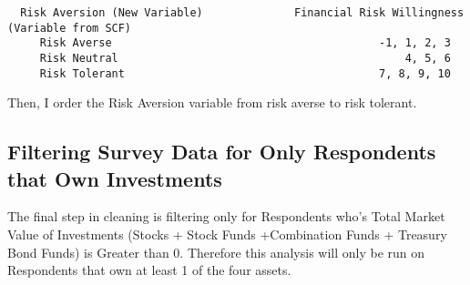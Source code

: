 \documentclass[
]{article}
\newenvironment{Shaded}{\begin{snugshade}}{\end{snugshade}}
\newcommand{\DataTypeTok}[1]{\textcolor[rgb]{0.13,0.29,0.53}{#1}}
\newcommand{\DecValTok}[1]{\textcolor[rgb]{0.00,0.00,0.81}{#1}}
\newcommand{\KeywordTok}[1]{\textcolor[rgb]{0.13,0.29,0.53}{\textbf{#1}}}
\newcommand{\NormalTok}[1]{#1}
\newcommand{\OperatorTok}[1]{\textcolor[rgb]{0.81,0.36,0.00}{\textbf{#1}}}
\newcommand{\OtherTok}[1]{\textcolor[rgb]{0.56,0.35,0.01}{#1}}
\newcommand{\StringTok}[1]{\textcolor[rgb]{0.31,0.60,0.02}{#1}}
\begin{document}
\begin{verbatim}
  Risk Aversion (New Variable)              Financial Risk Willingness (Variable from SCF)
     Risk Averse                                         -1, 1, 2, 3
     Risk Neutral                                            4, 5, 6
     Risk Tolerant                                       7, 8, 9, 10
\end{verbatim}

\begin{Shaded}
\end{Shaded}

Then, I order the Risk Aversion variable from risk averse to risk
tolerant.

\begin{Shaded}
\end{Shaded}

\hypertarget{filtering-survey-data-for-only-respondents-that-own-investments}{%
\subsection{Filtering Survey Data for Only Respondents that Own
Investments}\label{filtering-survey-data-for-only-respondents-that-own-investments}}

The final step in cleaning is filtering only for Respondents who's Total
Market Value of Investments (Stocks + Stock Funds +Combination Funds +
Treasury Bond Funds) is Greater than 0. Therefore this analysis will
only be run on Respondents that own at least 1 of the four assets.
\end{document}
